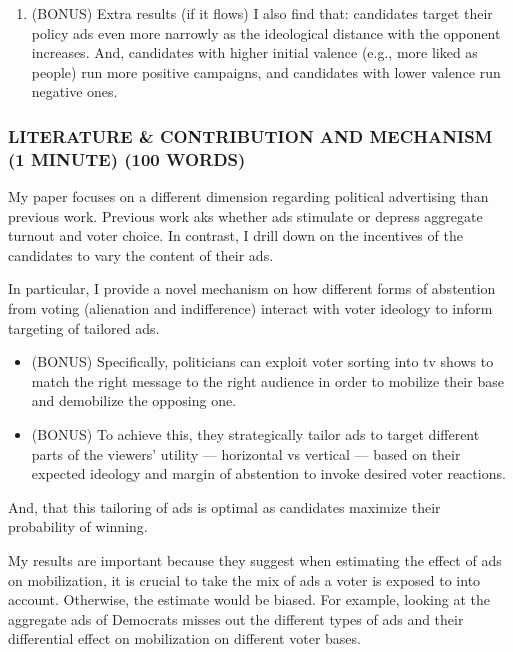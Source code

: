 \documentclass[12pt]{article}
\theoremstyle{plain}
\theoremstyle{plain}
\theoremstyle{plain}
\theoremstyle{plain}
\theoremstyle{plain}
\theoremstyle{plain}
\begin{document}
\begin{enumerate}
\item (BONUS) Extra results (if it flows)
\label{sec:orga2e100d}
I also find that:
candidates target their policy ads even more narrowly as the ideological distance with the opponent increases.
And, candidates with higher initial valence (e.g., more liked as people) run more positive campaigns, and candidates with lower valence run negative ones.





\clearpage
\end{enumerate}

\subsubsection{LITERATURE \& CONTRIBUTION AND MECHANISM (1 MINUTE) (100 WORDS)}
\label{sec:org4313b41}

My paper focuses on a different dimension regarding political advertising than previous work.
Previous work aks whether ads stimulate or depress aggregate turnout and voter choice.
In contrast, I drill down on the incentives of the candidates to vary the content of their ads.

In particular, I provide a novel mechanism on how different forms of abstention from voting (alienation and indifference) interact with voter ideology to inform targeting of tailored ads.
\begin{itemize}
\item (BONUS) Specifically, politicians can exploit voter sorting into tv shows to match the right message to the right audience in order to mobilize their base and demobilize the opposing one.
\item (BONUS) To achieve this, they strategically tailor ads to target different parts of the viewers' utility --- horizontal vs vertical --- based on their expected ideology and margin of abstention to invoke desired voter reactions.
\end{itemize}
And, that this tailoring of ads is optimal as candidates maximize their probability of winning.

My results are important because they suggest when estimating the effect of ads on mobilization, it is crucial to take the mix of ads a voter is exposed to into account.
Otherwise, the estimate would be biased.
For example, looking at the aggregate ads of Democrats misses out the different types of ads and their differential effect on mobilization on different voter bases.
\end{document}
